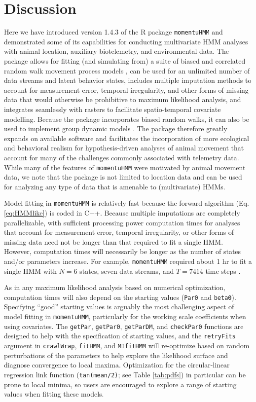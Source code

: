 \documentclass[12pt]{article}\usepackage[]{graphicx}\usepackage[]{color}
\begin{document}
\section{Discussion}
Here we have introduced version 1.4.3 of the R package \verb|momentuHMM| and demonstrated some of its capabilities for conducting multivariate HMM analyses with animal location, auxiliary biotelemetry, and environmental data. The package allows for fitting (and simulating from) a suite of biased and correlated random walk movement process models \citep[e.g.][]{McClintockEtAl2012}, can be used for an unlimited number of data streams and latent behavior states, includes multiple imputation methods to account for measurement error, temporal irregularity, and other forms of missing data that would otherwise be prohibitive to maximum likelihood analysis, and integrates seamlessly with rasters to facilitate spatio-temporal covariate modelling. Because the package incorporates biased random walks, it can also be used to implement group dynamic models \cite[e.g.][]{LangrockEtAl2014}. The package therefore greatly expands on available software and facilitates the incorporation of more ecological and behavioral realism for hypothesis-driven analyses of animal movement that account for many of the challenges commonly associated with telemetry data. While many of the features of \verb|momentuHMM| were motivated by animal movement data, we note that the package is not limited to location data and can be used for analyzing any type of data that is amenable to (multivariate) HMMs.

Model fitting in \verb|momentuHMM| is relatively fast because the forward algorithm (Eq. \ref{eq:HMMlike}) is coded in C++. Because multiple imputations are completely parallelizable, with sufficient processing power computation times for analyses that account for measurement error, temporal irregularity, or other forms of missing data need not be longer than that required to fit a single HMM.  However, computation times will necessarily be longer as the number of states and/or parameters increase. For example, \verb|momentuHMM| required about 1 hr to fit a single HMM with $N=6$ states, seven data streams, and $T=7414$ time steps \citep{McClintock2017}. 

As in any maximum likelihood analysis based on numerical optimization, computation times will also depend on the starting values (\verb|Par0| and \verb|beta0|). Specifying ``good'' starting values is arguably the most challenging aspect of model fitting in \verb|momentuHMM|, particularly for the working scale coefficients when using covariates. The \verb|getPar|, \verb|getPar0|, \verb|getParDM|, and \verb|checkPar0| functions are designed to help with the specification of starting values, and the \verb|retryFits| argument in \verb|crawlWrap|, \verb|fitHMM|, and \verb|MIfitHMM| will re-optimize based on random perturbations of the parameters to help explore the likelihood surface and diagnose convergence to local maxima. Optimization for the circular-linear regression link function (\verb|tan(mean/2)|; see Table \ref{tab:pdfs}) in particular can be prone to local minima, so users are encouraged to explore a range of starting values when fitting these models.
\end{document}
